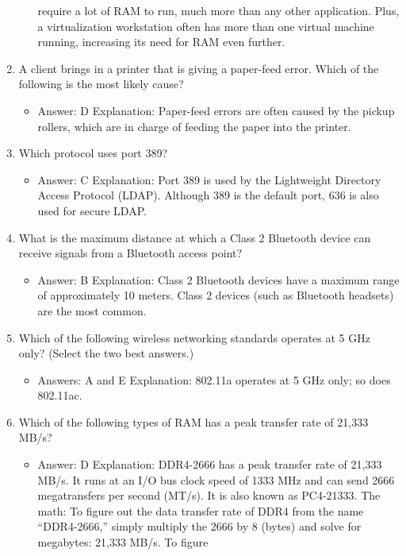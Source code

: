 \documentclass{article}
\begin{document}
\begin{enumerate}
\begin{itemize}
require a lot of RAM to run, much more than any other application. Plus, a virtualization
workstation often has more than one virtual machine running, increasing its need
for RAM even further.
    \end{itemize}
     \item A client brings in a printer that is giving a paper-feed error. Which
of the following is the most likely cause?
    \begin{itemize}
        \item Answer: D
Explanation: Paper-feed errors are often caused by the pickup rollers, which are in
charge of feeding the paper into the printer.
    \end{itemize}
     \item Which protocol uses port 389?
    \begin{itemize}
        \item Answer: C
Explanation: Port 389 is used by the Lightweight Directory Access Protocol (LDAP).
Although 389 is the default port, 636 is also used for secure LDAP.
    \end{itemize}
    \item What is the maximum distance at which a Class 2 Bluetooth device
can receive signals from a Bluetooth access point?
    \begin{itemize}
        \item Answer: B
Explanation: Class 2 Bluetooth devices have a maximum range of approximately
10 meters. Class 2 devices (such as Bluetooth headsets) are the most common.
    \end{itemize}
    \item Which of the following wireless networking standards operates at
5 GHz only? (Select the two best answers.)
    \begin{itemize}
        \item Answers: A and E
Explanation: 802.11a operates at 5 GHz only; so does 802.11ac.
    \end{itemize}
    \item Which of the following types of RAM has a peak transfer rate of
21,333 MB/s?
    \begin{itemize}
        \item Answer: D
Explanation: DDR4-2666 has a peak transfer rate of 21,333 MB/s. It runs at an I/O bus
clock speed of 1333 MHz and can send 2666 megatransfers per second (MT/s). It is
also known as PC4-21333.
The math: To figure out the data transfer rate of DDR4 from the name “DDR4-2666,”
simply multiply the 2666 by 8 (bytes) and solve for megabytes: 21,333 MB/s. To figure

\end{itemize}
\end{enumerate}
\end{document}
